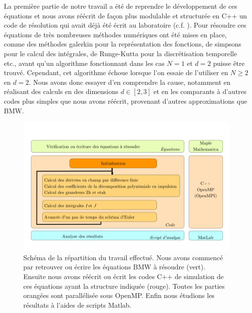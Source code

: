 \documentclass[10pt]{article}
\begin{document}
\begin{multicols}{2}
La première partie de notre travail a été de reprendre le développement de ces équations et nous avons réécrit de façon plus modulable et structurée en C++ un code de résolution qui avait déjà été écrit au laboratoire (c.f. ). Pour résoudre ces équations de très nombreuses méthodes numériques ont été mises en place, comme des méthodes galerkin \cite{shen1994efficient, LeonardThesis} pour la représentation des fonctions, de simpsons pour le calcul des intégrales, de Runge-Kutta pour la discrétisation temporelle etc., avant qu'un algorithme fonctionnant dans les cas $N=1$ et $d=2$ puisse être trouvé. Cependant, cet algorithme échoue lorsque l'on essaie de l'utiliser en $N \ge 2$ en $d=2$. Nous avons donc essayer d'en comprendre la cause, notamment en réalisant des calculs en des dimensions $d \in [2,3]$ et en les comparants à d'autres codes plus simples que nous avons réécrit, provenant d'autres approximations que BMW. 


\end{multicols}
\begin{figure}[H]
	\begin{center}
		\includegraphics[width=0.95\columnwidth]{Diagramme_Code_2.pdf}
		\caption{Schéma de la répartition du travail effectué. Nous avons commencé par retrouver ou écrire les équations BMW à résoudre (vert). Ensuite nous avons réécrit ou écrit les codes C++ de simulation de ces équations ayant la structure indiquée (rouge). Toutes les parties orangées sont parallélisée sous OpenMP. Enfin nous étudions les résultats à l'aides de scripts Matlab.}
		\label{fig:org}
	\end{center}
\end{figure}
\end{document}
